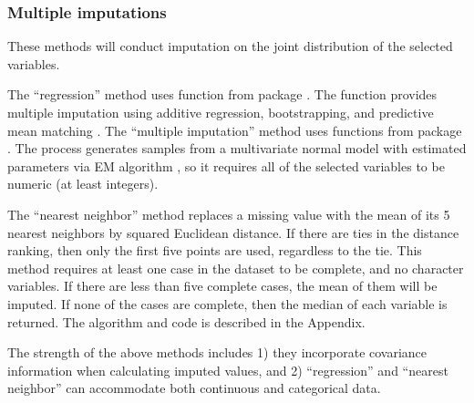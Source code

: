 \documentclass[article]{jss}
\begin{document}
\subsubsection{Multiple imputations}

These methods will conduct imputation on the joint distribution of the selected variables. 

The ``regression'' method uses function  from package . The function provides multiple imputation using additive regression, bootstrapping, and predictive mean matching \citep{hmisc}. The ``multiple imputation'' method uses functions from package . The process generates samples from a multivariate normal model with estimated parameters via EM algorithm \citep{norm}, so it requires all of the selected variables to be numeric (at least integers).

The ``nearest neighbor'' method replaces a missing value with the mean of its 5 nearest neighbors by squared Euclidean distance. If there are ties in the distance ranking, then only the first five points are used, regardless to the tie. This method requires at least one case in the dataset to be complete, and no character variables. If there are less than five complete cases, the mean of them will be imputed. If none of the cases are complete, then the median of each variable is returned. The algorithm and code is described in the Appendix.

The strength of the above methods includes 1) they incorporate covariance information when calculating imputed values, and  2) ``regression'' and ``nearest neighbor'' can accommodate both continuous and categorical data.
\end{document}
